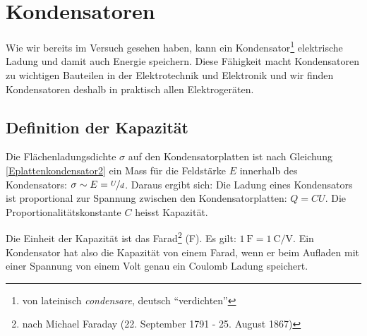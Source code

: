\documentclass[11pt,twoside=false,open=any]{scrbook}
\begin{document}
\chapter{Kondensatoren}
Wie wir bereits im Versuch gesehen haben, kann ein Kondensator\footnote{von lateinisch \textit{condensare}, deutsch ``verdichten''} elektrische Ladung und damit auch Energie speichern. Diese Fähigkeit macht Kondensatoren zu wichtigen Bauteilen in der Elektrotechnik und Elektronik und wir finden Kondensatoren deshalb in praktisch allen Elektrogeräten.

\section{Definition der Kapazität}
Die Flächenladungsdichte $\sigma$ auf den Kondensatorplatten ist nach Gleichung \ref{Eplattenkondensator2} ein Mass für die Feldstärke $E$ innerhalb des Kondensators: $\sigma \sim E = \nicefrac{U}{d}$. Daraus ergibt sich: Die Ladung eines Kondensators ist proportional zur Spannung zwischen den Kondensatorplatten: $Q = C U$. Die Proportionalitätskonstante $C$ heisst Kapazität.

\begin{center}
   \setlength{\fboxrule}{2pt}
\end{center}
Die Einheit der Kapazität ist das Farad\footnote{nach Michael Faraday (22. September 1791 - 25. August 1867)} (\si{\farad}). Es gilt: $\SI{1}{\farad} = \SI{1}{\coulomb\per\volt}$. Ein Kondensator hat also die Kapazität von einem Farad, wenn er beim Aufladen mit einer Spannung von einem Volt genau ein Coulomb Ladung speichert.

\begin{center}
   \setlength{\fboxrule}{2pt}
\end{center}
\end{document}
